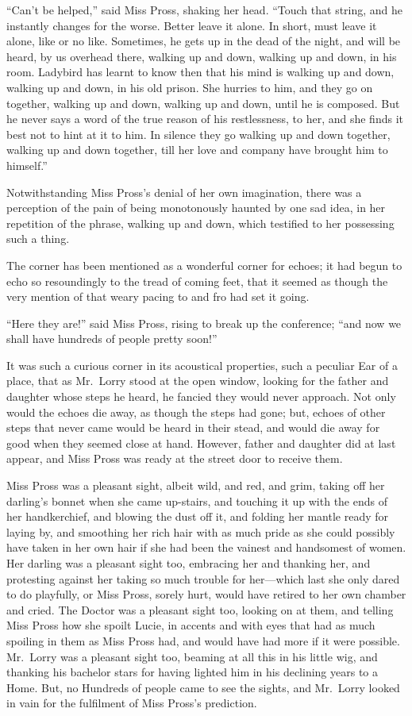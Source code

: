 ``Can't be helped,'' said Miss Pross, shaking her head.  ``Touch that
string, and he instantly changes for the worse.  Better leave it
alone.  In short, must leave it alone, like or no like. Sometimes,
he gets up in the dead of the night, and will be heard, by us
overhead there, walking up and down, walking up and down, in his room.
Ladybird has learnt to know then that his mind is walking up and
down, walking up and down, in his old prison.  She hurries to him,
and they go on together, walking up and down, walking up and down,
until he is composed.  But he never says a word of the true reason of
his restlessness, to her, and she finds it best not to hint at it to him.
In silence they go walking up and down together, walking up and down
together, till her love and company have brought him to himself.''

Notwithstanding Miss Pross's denial of her own imagination, there was
a perception of the pain of being monotonously haunted by one sad idea,
in her repetition of the phrase, walking up and down, which testified
to her possessing such a thing.

The corner has been mentioned as a wonderful corner for echoes;
it had begun to echo so resoundingly to the tread of coming feet,
that it seemed as though the very mention of that weary pacing to and
fro had set it going.

``Here they are!'' said Miss Pross, rising to break up the conference;
``and now we shall have hundreds of people pretty soon!''

It was such a curious corner in its acoustical properties, such a
peculiar Ear of a place, that as Mr.\ Lorry stood at the open window,
looking for the father and daughter whose steps he heard, he fancied
they would never approach.  Not only would the echoes die away,
as though the steps had gone; but, echoes of other steps that never
came would be heard in their stead, and would die away for good when
they seemed close at hand.  However, father and daughter did at last
appear, and Miss Pross was ready at the street door to receive them.

Miss Pross was a pleasant sight, albeit wild, and red, and grim, taking
off her darling's bonnet when she came up-stairs, and touching it up
with the ends of her handkerchief, and blowing the dust off it, and
folding her mantle ready for laying by, and smoothing her rich hair
with as much pride as she could possibly have taken in her own hair
if she had been the vainest and handsomest of women.  Her darling was
a pleasant sight too, embracing her and thanking her, and protesting
against her taking so much trouble for her---which last she only dared
to do playfully, or Miss Pross, sorely hurt, would have retired to
her own chamber and cried.  The Doctor was a pleasant sight too,
looking on at them, and telling Miss Pross how she spoilt Lucie, in
accents and with eyes that had as much spoiling in them as Miss Pross
had, and would have had more if it were possible.  Mr.\ Lorry was a
pleasant sight too, beaming at all this in his little wig, and thanking
his bachelor stars for having lighted him in his declining years to a
Home.  But, no Hundreds of people came to see the sights, and Mr.\ Lorry
looked in vain for the fulfilment of Miss Pross's prediction.

